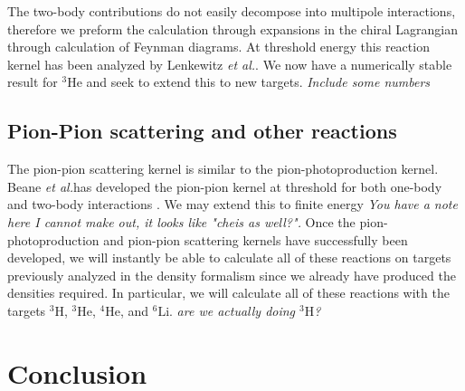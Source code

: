 \documentclass[a4paper,11pt]{article}
\newcommand{\etal}{\textit{et al.}}
\newcommand{\LiS}{{}^{6} \mathrm{Li} }
\newcommand{\HeF}{{}^{4} \mathrm{He}}
\newcommand{\HeT}{{}^{3} \mathrm{He}}
\newcommand{\HThree}{{}^{3} \mathrm{H}}
\newcommand{\ques}[1]{\color{red}\textit{ #1 }\color{black}}
\begin{document}
The two-body contributions do not easily decompose into multipole interactions, therefore we preform the calculation through expansions in the chiral Lagrangian through calculation of Feynman diagrams.
At threshold energy this reaction kernel has been analyzed by Lenkewitz \etal \cite{L2011, L2013}.
We now have a numerically stable result for $\HeT$ and seek to extend this to new targets.
\ques{Include some numbers}
\subsection{Pion-Pion scattering and other reactions}
The pion-pion scattering kernel is similar to the pion-photoproduction kernel.
Beane \etal has developed the pion-pion kernel at threshold for both one-body and two-body interactions \cite{Beane2003}.
We may extend this to finite energy\ques{You have a note here I cannot make out, it looks like "cheis as well?".} 
Once the pion-photoproduction and pion-pion scattering kernels have successfully been developed, we will instantly be able to calculate all of these reactions on targets previously analyzed in the density formalism since we already have produced the densities required.
In particular, we will calculate all of these reactions with the targets $\HThree$, $\HeT$, $\HeF$, and $\LiS$.\ques{are we actually doing $\HThree$?} 
\section{Conclusion}
\end{document}
